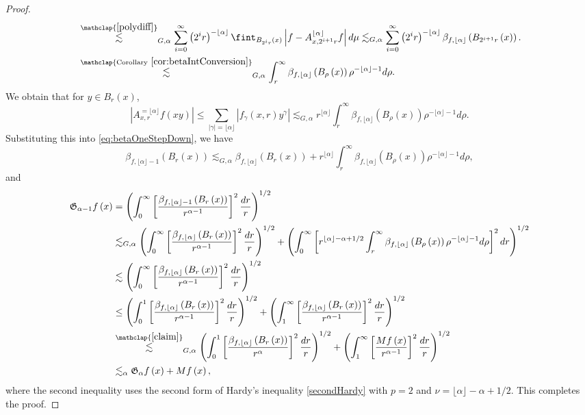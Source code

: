\documentclass[11pt,reqno]{amsart}
\newcommand{\1}{\mathbf 1}
\begin{document}
\begin{proof}
\begin{align*}
&\stackrel{\mathclap{\eqref{polydiff}}}{\lesssim}_{G,\alpha}\sum_{i=0}^\infty  \left(2^ir\right)^{-\lfloor\alpha\rfloor}\fint_{B_{2^ir}\left(x\right)}\left|f-A^{\lfloor\alpha\rfloor}_{x,2^{i+1}r}f\right|d\mu \lesssim_{G,\alpha} \sum_{i=0}^\infty  \left(2^ir\right)^{-\lfloor\alpha\rfloor} \beta_{f,\lfloor\alpha\rfloor}\left(B_{2^{i+1}r}\left(x\right)\right).\\
&\stackrel{\mathclap{\mathrm{Corollary~}\ref{cor:betaIntConversion}}}{\lesssim}_{G,\alpha}  \int_r^\infty \beta_{f,\lfloor\alpha\rfloor}\left(B_\rho\left(x\right)\right)\rho^{-\lfloor\alpha\rfloor-1}d\rho.
\end{align*}
We obtain that for $y\in B_r\left(x\right)$, 
\[
\left|A^{=\lfloor\alpha\rfloor}_{x,r}f\left(xy\right)\right|\le \sum_{\left|\gamma\right|=\lfloor\alpha\rfloor}\left|f_\gamma\left(x,r\right)y^\gamma\right|\lesssim_{G,\alpha} r^{\lfloor\alpha\rfloor}\int_r^\infty \beta_{f,\lfloor\alpha\rfloor}\left(B_\rho\left(x\right)\right)\rho^{-\lfloor\alpha\rfloor-1}d\rho.
\]
Substituting this into \eqref{eq:betaOneStepDown}, we have
\[
\beta_{f,\lfloor\alpha\rfloor-1}\left(B_r\left(x\right)\right)\lesssim_{G,\alpha}\beta_{f,\lfloor\alpha\rfloor}\left(B_r\left(x\right)\right)+r^{\lfloor\alpha\rfloor}\int_r^\infty \beta_{f,\lfloor\alpha\rfloor}\left(B_\rho\left(x\right)\right)\rho^{-\lfloor\alpha\rfloor-1}d\rho,
\]
and
\begin{align*}
\mathfrak{G}_{\alpha-1}f\left(x\right)&=\left(\int_0^\infty\left[\frac{\beta_{f,\lfloor\alpha\rfloor-1}\left(B_r\left(x\right)\right)}{r^{\alpha-1}}\right]^2 \frac{dr}{r}\right)^{1/2}\\
&\lesssim_{G,\alpha} \left(\int_0^\infty\left[\frac{\beta_{f,\lfloor\alpha\rfloor}\left(B_r\left(x\right)\right)}{r^{\alpha-1}}\right]^2 \frac{dr}{r}\right)^{1/2}+\left(\int_0^\infty \left[r^{\lfloor\alpha\rfloor-\alpha+1/2}\int_r^\infty \beta_{f,\lfloor\alpha\rfloor}\left(B_\rho\left(x\right)\right)\rho^{-\lfloor\alpha\rfloor-1}d\rho\right]^2 dr\right)^{1/2}\\
&\lesssim \left(\int_0^\infty\left[\frac{\beta_{f,\lfloor\alpha\rfloor}\left(B_r\left(x\right)\right)}{r^{\alpha-1}}\right]^2 \frac{dr}{r}\right)^{1/2}\\
&\le \left(\int_0^1\left[\frac{\beta_{f,\lfloor\alpha\rfloor}\left(B_r\left(x\right)\right)}{r^{\alpha-1}}\right]^2 \frac{dr}{r}\right)^{1/2}+\left(\int_1^\infty\left[\frac{\beta_{f,\lfloor\alpha\rfloor}\left(B_r\left(x\right)\right)}{r^{\alpha-1}}\right]^2 \frac{dr}{r}\right)^{1/2}\\
&\stackrel{\mathclap{\eqref{claim}}}{\lesssim}_{G,\alpha} \left(\int_0^1\left[\frac{\beta_{f,\lfloor\alpha\rfloor}\left(B_r\left(x\right)\right)}{r^\alpha}\right]^2 \frac{dr}{r}\right)^{1/2}+\left(\int_1^\infty\left[\frac{Mf\left(x\right)}{r^{\alpha-1}}\right]^2 \frac{dr}{r}\right)^{1/2}\\
&\lesssim_\alpha \mathfrak{G}_\alpha f\left(x\right)+Mf\left(x\right),
\end{align*}
where the second inequality uses the second form of Hardy's inequality \eqref{secondHardy} with $p=2$ and $\nu=\lfloor\alpha\rfloor-\alpha+1/2$. This completes the proof.
\end{proof}
\end{document}
